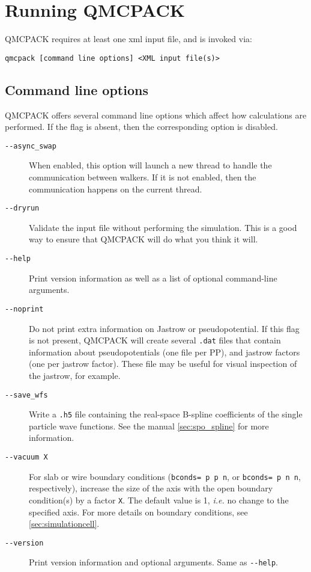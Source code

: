 \chapter{Running QMCPACK}
\label{chap:running}

QMCPACK requires at least one xml input file, and is invoked via:

{\texttt{qmcpack [command line options] <XML input file(s)>}}

\section{Command line options}
\label{sec:commandline}
QMCPACK offers several command line options which affect how calculations
are performed. If the flag is absent, then the corresponding
option is disabled.

\begin{description}
\item[\texttt{-{}-async\_swap}]{ When enabled, this option will launch a new thread
  to handle the communication between walkers. If it is not enabled,
  then the communication happens on the current thread. }
\item[\texttt{-{}-dryrun}]{ Validate the input file without performing the simulation.
  This is a good way to ensure that QMCPACK will do what you think it will. }
\item[\texttt{-{}-help}]{ Print version information as well as a list of optional
  command-line arguments. }
\item[\texttt{-{}-noprint}]{ Do not print extra information on Jastrow or pseudopotential.
  If this flag is not present, QMCPACK will create several \texttt{.dat} files
  that contain information about pseudopotentials (one file per PP), and jastrow
  factors (one per jastrow factor). These file may be useful for visual inspection
  of the jastrow, for example. }
\item[\texttt{-{}-save\_wfs}]{ Write a \texttt{.h5} file containing the real-space B-spline
  coefficients of the single particle wave functions. See the manual
  \ref{sec:spo_spline} for more information.}
\item[\texttt{-{}-vacuum X}]{ For slab or wire boundary conditions
  (\texttt{bconds= p p n}, or \texttt{bconds= p n n}, respectively),
  increase the size of the axis with the open boundary condition(s)
  by a factor \texttt{X}. The default value is 1,
  \textit{i.e.} no change to the specified axis. For more details
  on boundary conditions, see \ref{sec:simulationcell}. }
\item[\texttt{-{}-version}]{ Print version information and optional arguments.
  Same as \texttt{-{}-help}. }
\end{description}




